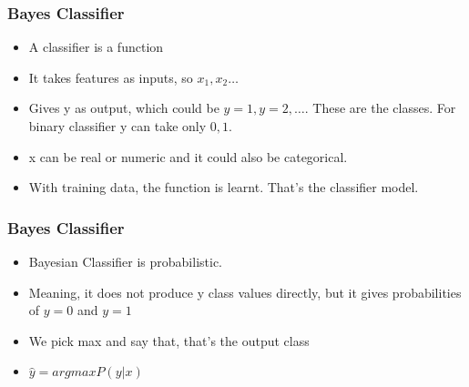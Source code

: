 \begin{frame}[fragile]\frametitle{Bayes Classifier}
	\begin{itemize}
	\item A classifier is a function
	\item It takes features as inputs, so $x_1,x_2 \ldots$
	\item Gives y as output, which could be $y=1,y=2,\ldots$. These are the classes. For binary classifier y can take only $0,1$.
	\item x can be real or numeric and it could also be categorical.
	\item With training data, the function is learnt. That's the classifier model.
	\end{itemize}

\end{frame}

\begin{frame}[fragile]\frametitle{Bayes Classifier}
	\begin{itemize}
	\item Bayesian Classifier is probabilistic.
	\item Meaning, it does not produce y class values directly,  but it gives probabilities of $y=0$ and $y=1$
	\item We pick max and say that, that's the output class
	\item $\hat{y} = arg max P (y|x)$
	\end{itemize}

\end{frame}




